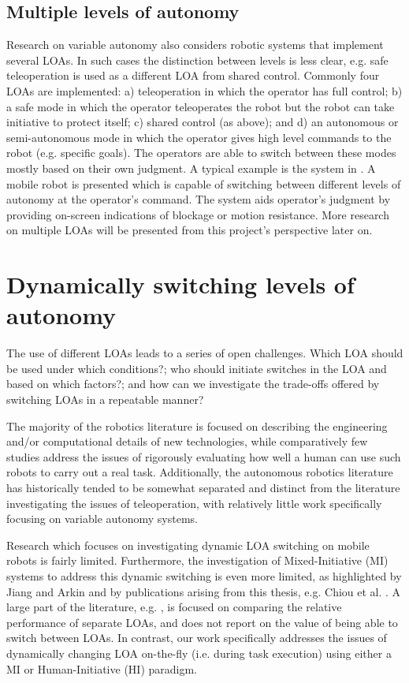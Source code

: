 \documentclass[a4paper,12pt,oneside,openright]{bhamthesis}
\begin{document}
\subsection{Multiple levels of autonomy}
Research on variable autonomy also considers robotic systems that implement several LOAs. In such cases the distinction between levels is less clear, e.g. safe teleoperation is used as a different LOA from shared control. Commonly four LOAs are implemented: a) teleoperation in which the operator has full control; b) a safe  mode in which the operator teleoperates the robot but the robot can take initiative to protect itself; c) shared control (as above); and d) an autonomous or semi-autonomous mode in which the operator gives high level commands to the robot (e.g. specific goals). The operators are able to switch between these modes mostly based on their own judgment. A typical example is the system in \citep{Bruemmer2002}. A mobile robot is presented which is capable of switching between different levels of autonomy at the operator's command. The system aids operator's judgment by providing on-screen indications of blockage or motion resistance. More research on multiple LOAs will be presented from this project's perspective later on.


\section{Dynamically switching levels of autonomy}
The use of different LOAs leads to a series of open challenges. Which LOA should be used under which conditions?; who should initiate switches in the LOA and based on which factors?; and how can we investigate the trade-offs offered by switching LOAs in a repeatable manner?

The majority of the robotics literature is focused on describing the engineering and/or computational details of new technologies, while comparatively few studies address the issues of rigorously evaluating how well a human can use such robots to carry out a real task. Additionally, the autonomous robotics literature has historically tended to be somewhat separated and distinct from the literature investigating the issues of teleoperation, with relatively little work specifically focusing on variable autonomy systems.

Research which focuses on investigating dynamic LOA switching on mobile robots is fairly limited. Furthermore, the investigation of Mixed-Initiative (MI) systems to address this dynamic switching is even more limited, as highlighted by Jiang and Arkin \citep{Jiang2015} and by publications arising from this thesis, e.g. Chiou et al. \citep{Chiou2015}. A large part of the literature, e.g. \citep{Krotkov1996, Bruemmer2005}, is focused on comparing the relative performance of separate LOAs, and does not report on the value of being able to switch between LOAs. In contrast, our work specifically addresses the issues of dynamically changing LOA on-the-fly (i.e. during task execution) using either a MI or Human-Initiative (HI) paradigm. 
\end{document}
